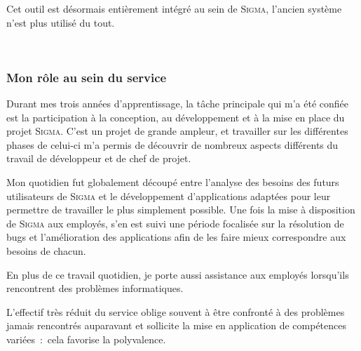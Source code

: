 \begin{itemize}
    Cet outil est désormais entièrement intégré au sein de \textsc{Sigma}, l'ancien système n'est plus utilisé du tout.
\end{itemize}
~\\

\subsubsection{Mon rôle au sein du service}

Durant mes trois années d'apprentissage, la tâche principale qui m'a été confiée est la participation à la conception, au développement et à la mise en place du projet \textsc{Sigma}.
C'est un projet de grande ampleur, et travailler sur les différentes phases de celui-ci m'a permis de découvrir de nombreux aspects différents du travail de développeur et de chef de projet.

Mon quotidien fut globalement découpé entre l'analyse des besoins des futurs utilisateurs de \textsc{Sigma} et le développement d'applications adaptées pour leur permettre de travailler le plus simplement possible.
Une fois la mise à disposition de \textsc{Sigma} aux employés, s'en est suivi une période focalisée sur la résolution de bugs et l'amélioration des applications afin de les faire mieux correspondre aux besoins de chacun.

En plus de ce travail quotidien, je porte aussi assistance aux employés lorsqu'ils rencontrent des problèmes informatiques.

L'effectif très réduit du service oblige souvent à être confronté à des problèmes jamais rencontrés auparavant et sollicite la mise en application de compétences variées~:~cela favorise la polyvalence.